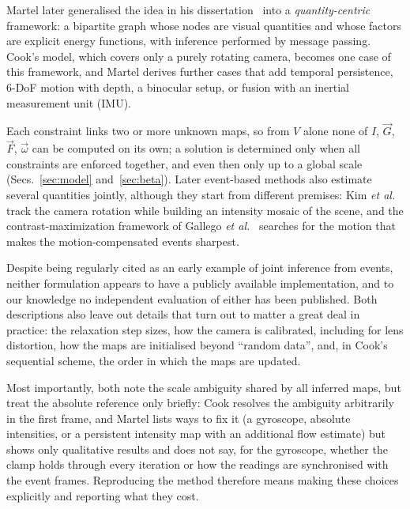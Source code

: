 \documentclass[journal]{IEEEtran}
\newcommand{\Imap}{I}
\newcommand{\Vmap}{V}
\newcommand{\Gmap}{\vec{G}}
\newcommand{\Fmap}{\vec{F}}
\newcommand{\wvec}{\vec{\omega}}
\begin{document}
Martel later generalised the idea in his dissertation~\cite{martel2019thesis} into a \emph{quantity-centric} framework: a bipartite graph whose nodes are visual quantities and whose factors are explicit energy functions, with inference performed by message passing. Cook's model, which covers only a purely rotating camera, becomes one case of this framework, and Martel derives further cases that add temporal persistence, 6-DoF motion with depth, a binocular setup, or fusion with an inertial measurement unit (IMU).

Each constraint links two or more unknown maps, so from $\Vmap$ alone none of $\Imap$, $\Gmap$, $\Fmap$, $\wvec$ can be computed on its own; a solution is determined only when all constraints are enforced together, and even then only up to a global scale (Secs.~\ref{sec:model} and~\ref{sec:beta}). Later event-based methods also estimate several quantities jointly, although they start from different premises: Kim \emph{et al.}~\cite{kim2014} track the camera rotation while building an intensity mosaic of the scene, and the contrast-maximization framework of Gallego \emph{et al.}~\cite{gallego2018cmax} searches for the motion that makes the motion-compensated events sharpest.

Despite being regularly cited as an early example of joint inference from events, neither formulation appears to have a publicly available implementation, and to our knowledge no independent evaluation of either has been published. Both descriptions also leave out details that turn out to matter a great deal in practice: the relaxation step sizes, how the camera is calibrated, including for lens distortion, how the maps are initialised beyond ``random data'', and, in Cook's sequential scheme, the order in which the maps are updated.

Most importantly, both note the scale ambiguity shared by all inferred maps, but treat the absolute reference only briefly: Cook resolves the ambiguity arbitrarily in the first frame, and Martel lists ways to fix it (a gyroscope, absolute intensities, or a persistent intensity map with an additional flow estimate) but shows only qualitative results and does not say, for the gyroscope, whether the clamp holds through every iteration or how the readings are synchronised with the event frames. Reproducing the method therefore means making these choices explicitly and reporting what they cost. 
\end{document}

